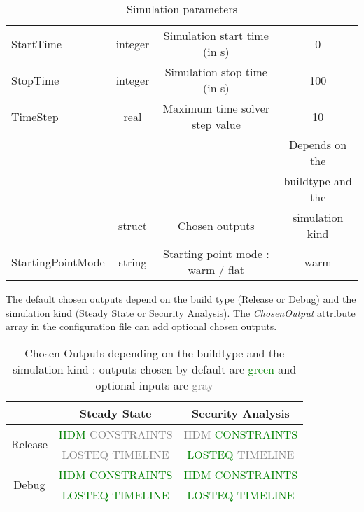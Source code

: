 \documentclass[a4paper, 12pt]{report}
\begin{document}
\begin{table}[H]
\begin{tabular}{ l | c | c | c }
\small{StartTime} & \small{integer} & \small{Simulation start time (in s)} & \small{0} \\
\rowcolor{gray!10}
\small{StopTime} & \small{integer} & \small{Simulation stop time (in s)} & \small{100} \\
\rowcolor{white}
\small{TimeStep} & \small{real} & \small{Maximum time solver step value} & \small{10} \\
\rowcolor{gray!10}
& & & \small{Depends on the} \\
\rowcolor{gray!10}
& & & \small{buildtype and the} \\
\rowcolor{gray!10}
\multirow{-3}{*}{\small{ChosenOutputs}} & \multirow{-3}{*}{\small{struct}}  & \multirow{-3}{*}{\small{Chosen outputs}} & \small{simulation kind} \\
\rowcolor{white}
\small{StartingPointMode} & \small{string} & \small{Starting point mode : warm / flat} & \small{warm} \\
\bottomrule
\end{tabular}
\caption{Simulation parameters}
\end{table}

\begin{table}[H]
The default chosen outputs depend on the build type (Release or Debug) and the simulation kind (Steady State or Security Analysis). The \textit{ChosenOutput} attribute array in the configuration file can add optional chosen outputs.
\center
\begin{tabular}{| c | c | c |}
\cline{2-3}
\multicolumn{1}{c|}{} & Steady State & Security Analysis \\
\hline
\multirow{2}{*}{Release} & \textcolor{green}{\small{IIDM} \textcolor{gray}{CONSTRAINTS}} & \small{\textcolor{gray}{IIDM} \textcolor{green}{CONSTRAINTS}} \\
& \small{\textcolor{gray}{LOSTEQ}} \textcolor{gray}{TIMELINE} & \small{\textcolor{green}{LOSTEQ} \textcolor{gray}{TIMELINE}} \\
\hline
\multirow{2}{*}{Debug} & \textcolor{green}{\small{IIDM CONSTRAINTS}} & \textcolor{green}{\small{IIDM CONSTRAINTS}} \\
& \textcolor{green}{\small{LOSTEQ TIMELINE}} & \textcolor{green}{\small{LOSTEQ TIMELINE}} \\
\hline
\end{tabular}
\caption{Chosen Outputs depending on the buildtype and the simulation kind : outputs chosen by default are \textcolor{green}{green} and optional inputs are \textcolor{gray}{gray}}
\end{table}
\end{document}
